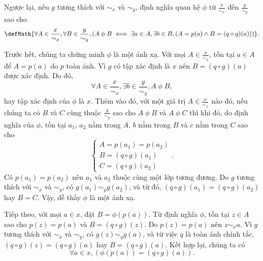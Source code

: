 Ngược lại, nếu $g$ tương thích với $\sim_x$ và $\sim_y$, định nghĩa quan hệ $\phi$ từ $\frac{x}{\sim_x}$ đến $\frac{y}{\sim_y}$ sao cho \begin{equation*}
   \defMath{\forall A \in \frac{x}{\sim_x}, \forall B \in \frac{y}{\sim_y}, (A\;\phi\;B \iff \exists a \in A, \exists b \in B, (A = p(a) \land B = (q\circ g)(a)))}.
\end{equation*}

Trước hết, chúng ta chứng minh $\phi$ là một ánh xạ. Với mọi $A \in \frac{x}{\sim_x}$, tồn tại $a \in A$ để $A = p(a)$ do $p$ toàn ánh. Vì $g$ có tập xác định là $x$ nên $B = (q\circ g)(a)$ được xác định. Do đó, \begin{equation*}
   \forall A \in \frac{x}{\sim_x}, \exists b \in \frac{y}{\sim_y}, A\;\phi\;B,
\end{equation*}
hay tập xác định của $\phi$ là $x$. Thêm vào đó, với một giá trị $A \in \frac{x}{\sim_x}$ nào đó, nếu chúng ta có $B$ và $C$ cùng thuộc $\frac{y}{\sim_y}$ sao cho $A\;\phi\;B$ và $A\;\phi\;C$ thì khi đó, do định nghĩa của $\phi$, tồn tại $a_1$, $a_2$ nằm trong $A$, $b$ nằm trong $B$ và $c$ nằm trong $C$ sao cho \begin{equation*}
   \begin{cases}
      A = p(a_1) = p(a_2) \\
      B = (q \circ g)(a_1) \\
      C = (q \circ g)(a_2)
   \end{cases}.
\end{equation*}
Có $p(a_1) = p(a_2)$ nên $a_1$ và $a_2$ thuộc cùng một lớp tương đương. Do $g$ tương thích với $\sim_x$ và $\sim_y$, có $g(a_1) \sim_y g(a_2)$, và từ đó, $(q \circ g)(a_1) = (q \circ g)(a_2)$ hay $B = C$. Vậy, dễ thấy $\phi$ là một ánh xạ.

Tiếp theo, với mọi $a \in x$, đặt $B = \phi(p(a))$. Từ định nghĩa $\phi$, tồn tại $z \in A$ sao cho $p(z) = p(a)$ và $B = (q \circ g)(z)$. Do $p(z) = p(a)$ nên $z \sim_x a$. Vì $g$ tương thích với $\sim_x$ và $\sim_y$, có $g(z) \sim_y g(a)$, và từ việc $q$ là toàn ánh chính tắc, $(q \circ g)(z) = (q \circ g)(a)$ hay $B = (q \circ g)(a)$. Kết hợp lại, chúng ta có \begin{equation*}
   \forall a \in x, (\phi(p(a)) = (q \circ g)(a)).
\end{equation*}

